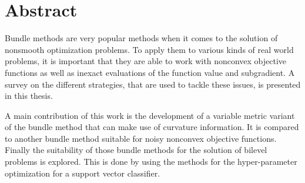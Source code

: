 \section*{Abstract}

Bundle methods are very popular methods when it comes to the solution of nonsmooth optimization problems. To apply them to various kinds of real world problems, it is important that they are able to work with nonconvex objective functions as well as inexact evaluations of the function value and subgradient.
A survey on the different strategies, that are used to tackle these issues, is presented in this thesis.

A main contribution of this work is the development of a variable metric variant of the bundle method that can make use of curvature information.  
It is compared to another bundle method suitable for noisy nonconvex objective functions.
Finally the suitability of those bundle methods for the solution of bilevel problems is explored. This is done by using the methods for the hyper-parameter optimization for a support vector classifier.




